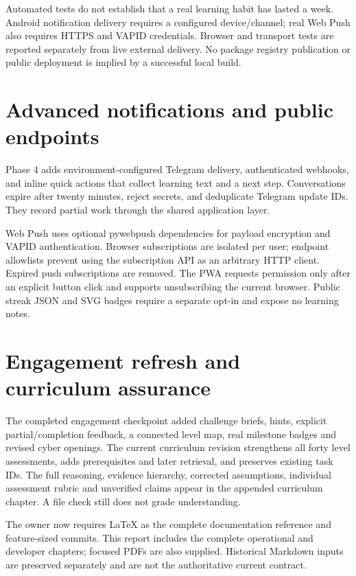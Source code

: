 \documentclass[11pt,a4paper]{article}
\begin{document}
Automated tests do not establish that a real learning habit has lasted a week.
Android notification delivery requires a configured device/channel; real Web Push
also requires HTTPS and VAPID credentials. Browser and transport tests are reported
separately from live external delivery. No package registry publication or public
deployment is implied by a successful local build.

\section{Advanced notifications and public endpoints}
Phase 4 adds environment-configured Telegram delivery, authenticated webhooks,
and inline quick actions that collect learning text and a next step. Conversations
expire after twenty minutes, reject secrets, and deduplicate Telegram update IDs.
They record partial work through the shared application layer.

Web Push uses optional pywebpush dependencies for payload encryption and VAPID
authentication. Browser subscriptions are isolated per user; endpoint allowlists
prevent using the subscription API as an arbitrary HTTP client. Expired push
subscriptions are removed. The PWA requests permission only after an explicit
button click and supports unsubscribing the current browser. Public streak JSON
and SVG badges require a separate opt-in and expose no learning notes.

\section{Engagement refresh and curriculum assurance}
The completed engagement checkpoint added challenge briefs, hints, explicit partial/completion feedback, a connected level map, real milestone badges and revised cyber openings. The current curriculum revision strengthens all forty level assessments, adds prerequisites and later retrieval, and preserves existing task IDs. The full reasoning, evidence hierarchy, corrected assumptions, individual assessment rubric and unverified claims appear in the appended curriculum chapter. A file check still does not grade understanding.

The owner now requires LaTeX as the complete documentation reference and feature-sized commits. This report includes the complete operational and developer chapters; focused PDFs are also supplied. Historical Markdown inputs are preserved separately and are not the authoritative current contract.
\end{document}
